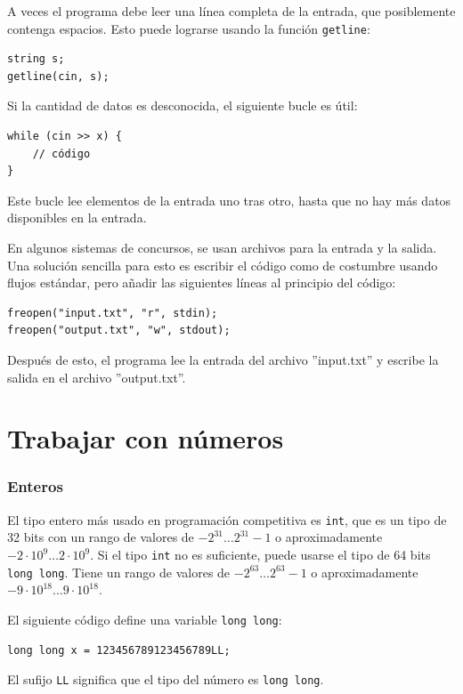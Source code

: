 A veces el programa debe leer una línea completa
de la entrada, que posiblemente contenga espacios.
Esto puede lograrse usando la
función \texttt{getline}:

\begin{lstlisting}
string s;
getline(cin, s);
\end{lstlisting}

Si la cantidad de datos es desconocida, el siguiente
bucle es útil:
\begin{lstlisting}
while (cin >> x) {
    // código
}
\end{lstlisting}
Este bucle lee elementos de la entrada
uno tras otro, hasta que no hay
más datos disponibles en la entrada.

En algunos sistemas de concursos, se usan archivos para
la entrada y la salida.
Una solución sencilla para esto es escribir
el código como de costumbre usando flujos estándar,
pero añadir las siguientes líneas al principio del código:
\begin{lstlisting}
freopen("input.txt", "r", stdin);
freopen("output.txt", "w", stdout);
\end{lstlisting}
Después de esto, el programa lee la entrada del archivo
''input.txt'' y escribe la salida en el archivo
''output.txt''.

\section{Trabajar con números}


\subsubsection{Enteros}

El tipo entero más usado en programación competitiva
es \texttt{int}, que es un tipo de 32 bits con
un rango de valores de $-2^{31} \ldots 2^{31}-1$
o aproximadamente $-2 \cdot 10^9 \ldots 2 \cdot 10^9$.
Si el tipo \texttt{int} no es suficiente,
puede usarse el tipo de 64 bits \texttt{long long}.
Tiene un rango de valores de $-2^{63} \ldots 2^{63}-1$
o aproximadamente $-9 \cdot 10^{18} \ldots 9 \cdot 10^{18}$.

El siguiente código define una
variable \texttt{long long}:
\begin{lstlisting}
long long x = 123456789123456789LL;
\end{lstlisting}
El sufijo \texttt{LL} significa que el
tipo del número es \texttt{long long}.


